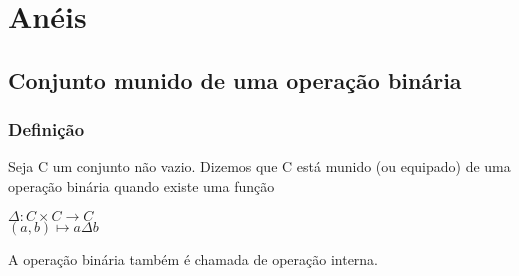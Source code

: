 \chapter{An{\'e}is}

\section{Conjunto munido de uma opera{\c c}{\~a}o bin{\'a}ria}
\subsection{Defini{\c c}{\~a}o}

\begin{definicao} Seja C um conjunto n{\~a}o vazio. Dizemos que C est{\'a} munido (ou equipado) de uma opera{\c c}{\~a}o bin{\'a}ria quando existe uma fun{\c c}{\~a}o
\begin{center}
$\Delta:C \times C\rightarrow C$\\
$(a,b)\longmapsto a\Delta b$
\end{center}
\end{definicao}

A opera{\c c}{\~a}o bin{\'a}ria tamb{\'e}m {\'e} chamada de opera{\c c}{\~a}o interna.


